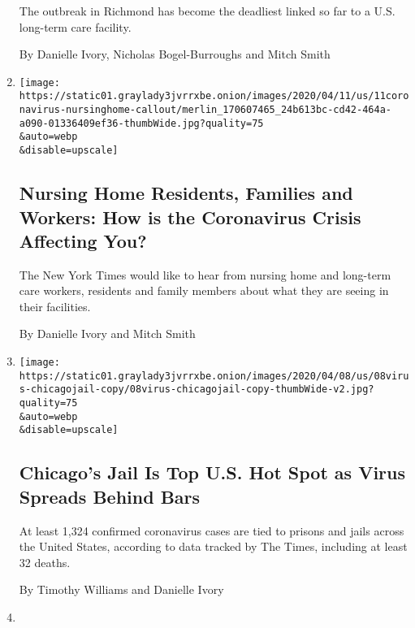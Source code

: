 \begin{enumerate}
  The outbreak in Richmond has become the deadliest linked so far to a
  U.S. long-term care facility.

  By Danielle Ivory, Nicholas Bogel-Burroughs and Mitch Smith
\item
  \href{/2020/04/11/business/nursing-home-callout.html}{}

  \texttt{[image: https://static01.graylady3jvrrxbe.onion/images/2020/04/11/us/11coronavirus-nursinghome-callout/merlin\_170607465\_24b613bc-cd42-464a-a090-01336409ef36-thumbWide.jpg?quality=75\\\&auto=webp\\\&disable=upscale]}

  \hypertarget{nursing-home-residents-families-and-workers-how-is-the-coronavirus-crisis-affecting-you}{%
  \subsection{Nursing Home Residents, Families and Workers: How is the
  Coronavirus Crisis Affecting
  You?}\label{nursing-home-residents-families-and-workers-how-is-the-coronavirus-crisis-affecting-you}}

  The New York Times would like to hear from nursing home and long-term
  care workers, residents and family members about what they are seeing
  in their facilities.

  By Danielle Ivory and Mitch Smith
\item
  \href{/2020/04/08/us/coronavirus-cook-county-jail-chicago.html}{}

  \texttt{[image: https://static01.graylady3jvrrxbe.onion/images/2020/04/08/us/08virus-chicagojail-copy/08virus-chicagojail-copy-thumbWide-v2.jpg?quality=75\\\&auto=webp\\\&disable=upscale]}

  \hypertarget{chicagos-jail-is-top-us-hot-spot-as-virus-spreads-behind-bars}{%
  \subsection{Chicago's Jail Is Top U.S. Hot Spot as Virus Spreads
  Behind
  Bars}\label{chicagos-jail-is-top-us-hot-spot-as-virus-spreads-behind-bars}}

  At least 1,324 confirmed coronavirus cases are tied to prisons and
  jails across the United States, according to data tracked by The
  Times, including at least 32 deaths.

  By Timothy Williams and Danielle Ivory
\item
  \href{/live/2020/coronavirus-covid-19-03-18/social-distancing-isnt-an-option-when-it-comes-to-prisons}{}


\end{enumerate}
